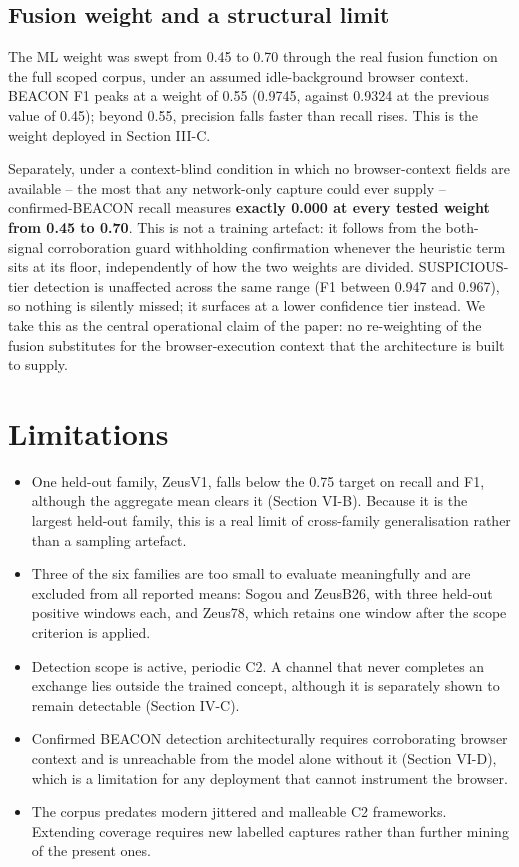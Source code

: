 \documentclass[conference,a4paper]{IEEEtran}
\begin{document}
\subsection{Fusion weight and a structural limit}
The ML weight was swept from 0.45 to 0.70 through the real fusion function on the full scoped corpus, under an assumed idle-background browser context. BEACON F1 peaks at a weight of 0.55 (0.9745, against 0.9324 at the previous value of 0.45); beyond 0.55, precision falls faster than recall rises. This is the weight deployed in Section III-C.

Separately, under a context-blind condition in which no browser-context fields are available -- the most that any network-only capture could ever supply -- confirmed-BEACON recall measures \textbf{exactly 0.000 at every tested weight from 0.45 to 0.70}. This is not a training artefact: it follows from the both-signal corroboration guard withholding confirmation whenever the heuristic term sits at its floor, independently of how the two weights are divided. SUSPICIOUS-tier detection is unaffected across the same range (F1 between 0.947 and 0.967), so nothing is silently missed; it surfaces at a lower confidence tier instead. We take this as the central operational claim of the paper: no re-weighting of the fusion substitutes for the browser-execution context that the architecture is built to supply.

\section{Limitations}

\begin{itemize}
\item One held-out family, ZeusV1, falls below the 0.75 target on recall and F1, although the aggregate mean clears it (Section VI-B). Because it is the largest held-out family, this is a real limit of cross-family generalisation rather than a sampling artefact.
\item Three of the six families are too small to evaluate meaningfully and are excluded from all reported means: Sogou and ZeusB26, with three held-out positive windows each, and Zeus78, which retains one window after the scope criterion is applied.
\item Detection scope is active, periodic C2. A channel that never completes an exchange lies outside the trained concept, although it is separately shown to remain detectable (Section IV-C).
\item Confirmed BEACON detection architecturally requires corroborating browser context and is unreachable from the model alone without it (Section VI-D), which is a limitation for any deployment that cannot instrument the browser.
\item The corpus predates modern jittered and malleable C2 frameworks. Extending coverage requires new labelled captures rather than further mining of the present ones.
\end{itemize}
\end{document}
